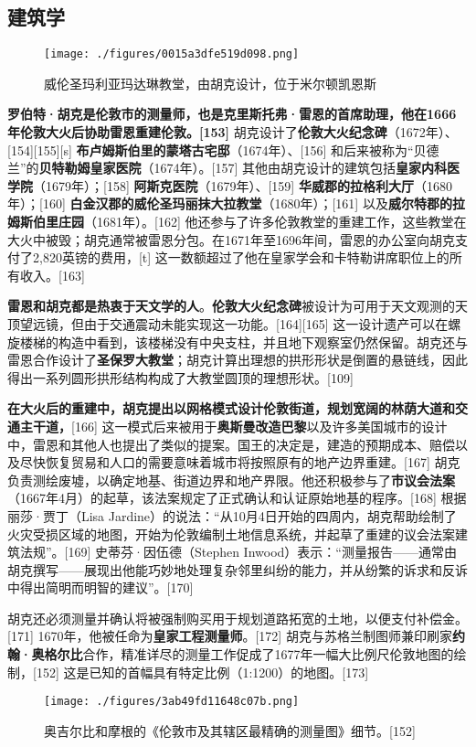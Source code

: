 \subsection{建筑学}
\begin{figure}[ht]
\centering
\texttt{[image: ./figures/0015a3dfe519d098.png]}
\caption{威伦圣玛利亚玛达琳教堂，由胡克设计，位于米尔顿凯恩斯} \label{fig_HK_8}
\end{figure}
\textbf{罗伯特·胡克是伦敦市的测量师，也是克里斯托弗·雷恩的首席助理，他在1666年伦敦大火后协助雷恩重建伦敦。[153]} 胡克设计了\textbf{伦敦大火纪念碑}（1672年）、[154][155][s] \textbf{布卢姆斯伯里的蒙塔古宅邸}（1674年）、[156] 和后来被称为“贝德兰”的\textbf{贝特勒姆皇家医院}（1674年）。[157] 其他由胡克设计的建筑包括\textbf{皇家内科医学院}（1679年）；[158] \textbf{阿斯克医院}（1679年）、[159] \textbf{华威郡的拉格利大厅}（1680年）；[160] \textbf{白金汉郡的威伦圣玛丽抹大拉教堂}（1680年）；[161] 以及\textbf{威尔特郡的拉姆斯伯里庄园}（1681年）。[162] 他还参与了许多伦敦教堂的重建工作，这些教堂在大火中被毁；胡克通常被雷恩分包。在1671年至1696年间，雷恩的办公室向胡克支付了2,820英镑的费用，[t] 这一数额超过了他在皇家学会和卡特勒讲席职位上的所有收入。[163]  

\textbf{雷恩和胡克都是热衷于天文学的人}。\textbf{伦敦大火纪念碑}被设计为可用于天文观测的天顶望远镜，但由于交通震动未能实现这一功能。[164][165] 这一设计遗产可以在螺旋楼梯的构造中看到，该楼梯没有中央支柱，并且地下观察室仍然保留。胡克还与雷恩合作设计了\textbf{圣保罗大教堂}；胡克计算出理想的拱形形状是倒置的悬链线，因此得出一系列圆形拱形结构构成了大教堂圆顶的理想形状。[109]  

\textbf{在大火后的重建中，胡克提出以网格模式设计伦敦街道，规划宽阔的林荫大道和交通主干道，}[166] 这一模式后来被用于\textbf{奥斯曼改造巴黎}以及许多美国城市的设计中，雷恩和其他人也提出了类似的提案。国王的决定是，建造的预期成本、赔偿以及尽快恢复贸易和人口的需要意味着城市将按照原有的地产边界重建。[167] 胡克负责测绘废墟，以确定地基、街道边界和地产界限。他还积极参与了\textbf{市议会法案}（1667年4月）的起草，该法案规定了正式确认和认证原始地基的程序。[168] 根据丽莎·贾丁（Lisa Jardine）的说法：“从10月4日开始的四周内，胡克帮助绘制了火灾受损区域的地图，开始为伦敦编制土地信息系统，并起草了重建的议会法案建筑法规”。[169] 史蒂芬·因伍德（Stephen Inwood）表示：“测量报告——通常由胡克撰写——展现出他能巧妙地处理复杂邻里纠纷的能力，并从纷繁的诉求和反诉中得出简明而明智的建议”。[170]  

胡克还必须测量并确认将被强制购买用于规划道路拓宽的土地，以便支付补偿金。[171] 1670年，他被任命为\textbf{皇家工程测量师}。[172] 胡克与苏格兰制图师兼印刷家\textbf{约翰·奥格尔比}合作，精准详尽的测量工作促成了1677年一幅大比例尺伦敦地图的绘制，[152] 这是已知的首幅具有特定比例（1:1200）的地图。[173]
\begin{figure}[ht]
\centering
\texttt{[image: ./figures/3ab49fd11648c07b.png]}
\caption{奥吉尔比和摩根的《伦敦市及其辖区最精确的测量图》细节。[152]} \label{fig_HK_9}
\end{figure}
